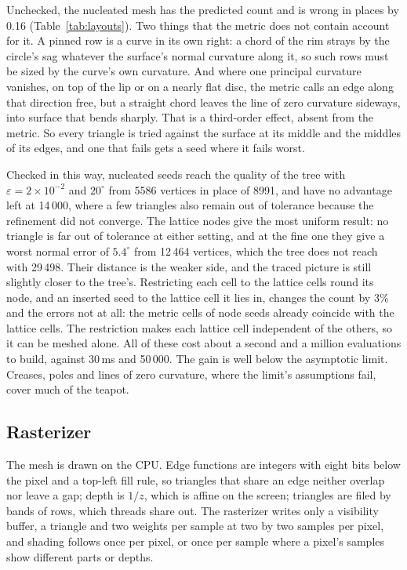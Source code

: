 \documentclass[journal]{IEEEtran}
\begin{document}
Unchecked, the nucleated mesh has the predicted count and is wrong in
places by 0.16 (Table~\ref{tab:layouts}). Two things that the metric
does not contain account for it. A pinned row is a curve in its own
right: a chord of the rim strays by the circle's sag whatever the
surface's normal curvature along it, so such rows must be sized by the
curve's own curvature. And where one principal curvature vanishes, on
top of the lip or on a nearly flat disc, the metric calls an edge along
that direction free, but a straight chord leaves the line of zero
curvature sideways, into surface that bends sharply. That is a
third-order effect, absent from the metric. So every triangle
is tried against the surface at its middle and the middles of its edges,
and one that fails gets a seed where it fails worst.

Checked in this way, nucleated seeds reach the quality of the tree with
$\varepsilon=2\times10^{-2}$ and $20^\circ$ from 5586 vertices in place
of 8991, and have no advantage left at 14\,000, where a few triangles
also remain out of tolerance because the refinement did not converge.
The lattice nodes give the most uniform result: no triangle is far
out of tolerance at either setting, and at the fine one they give a
worst normal error of $5.4^\circ$ from 12\,464 vertices, which the tree
does not reach with 29\,498. Their distance is the weaker side, and the
traced picture is still slightly closer to the tree's. Restricting each
cell to the lattice cells round its node, and an inserted seed to the
lattice cell it lies in, changes the count by 3\% and the errors not at
all: the metric cells of node seeds already coincide with the lattice
cells. The restriction makes each lattice cell independent of the
others, so it can be meshed alone. All of these
cost about a second and a million evaluations to build, against 30\,ms
and 50\,000. The gain is well below the asymptotic limit. Creases,
poles and lines of zero curvature, where the limit's assumptions fail,
cover much of the teapot.

\subsection{Rasterizer}

The mesh is drawn on the CPU. Edge functions are integers with eight
bits below the pixel and a top-left fill rule, so triangles that share
an edge neither overlap nor leave a gap; depth is $1/z$, which is affine
on the screen; triangles are filed by bands of rows, which threads
share out. The rasterizer writes only a visibility buffer, a triangle
and two weights per sample at two by two samples per pixel, and shading
follows once per pixel, or once per sample where a pixel's samples show
different parts or depths. 
\end{document}
